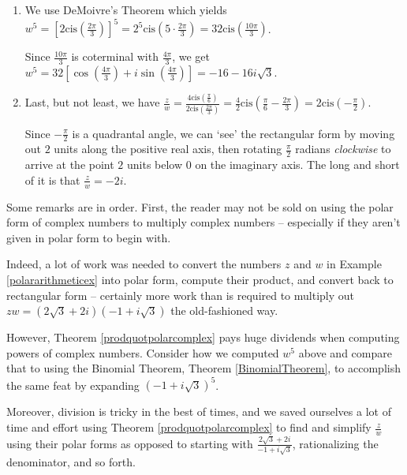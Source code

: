 \documentclass{ximera}
\begin{document}
\begin{example}
\begin{explanation}
\begin{enumerate}
\item We use DeMoivre's Theorem which yields $w^{5} = \left[2\text{cis}\left(\frac{2\pi}{3}\right)\right]^{5} = 2^{5} \text{cis} \left(5\cdot \frac{2\pi}{3}\right) = 32 \text{cis}\left(\frac{10\pi}{3}\right)$.  

 

Since $\frac{10\pi}{3}$ is coterminal with $\frac{4\pi}{3}$, we get $w^{5} = 32\left[ \cos\left(\frac{4\pi}{3}\right) + i\sin\left(\frac{4\pi}{3}\right) \right] = -16-16i\sqrt{3}$.

\item  Last, but not least, we have $\frac{z}{w} = \frac{4 \text{cis}\left(\frac{\pi}{6}\right)}{2\text{cis}\left(\frac{2\pi}{3}\right)} = \frac{4}{2} \text{cis}\left(\frac{\pi}{6} - \frac{2\pi}{3}\right) = 2\text{cis}\left(-\frac{\pi}{2}\right)$.  

 

Since $-\frac{\pi}{2}$ is a quadrantal angle, we can `see' the rectangular form by moving out $2$ units along the positive real axis, then rotating $\frac{\pi}{2}$ radians \textit{clockwise} to arrive at the point $2$ units below $0$ on the imaginary axis.  The long and short of it is that $\frac{z}{w} = -2i$. 

\end{enumerate}
\end{explanation}
\end{example}

Some remarks are in order.  First, the reader may not be sold on using the polar form of complex numbers to multiply complex numbers -- especially if they aren't given in polar form to begin with. 

 

Indeed, a lot of work was needed to convert the numbers $z$ and $w$ in Example \ref{polararithmeticex} into polar form, compute their product, and convert back to rectangular form -- certainly more work than is required to multiply out $zw =  (2\sqrt{3} + 2i)(-1 + i\sqrt{3})$ the old-fashioned way.  

 

However, Theorem \ref{prodquotpolarcomplex} pays huge dividends when computing powers of complex numbers.  Consider how we computed $w^{5}$ above and compare that to using the Binomial Theorem, Theorem \ref{BinomialTheorem}, to accomplish the same feat by expanding  $(-1 + i\sqrt{3})^{5}$. 

 

Moreover,  division is tricky in the best of times, and we saved ourselves a lot of time and effort using Theorem \ref{prodquotpolarcomplex} to find and simplify $\frac{z}{w}$ using their polar forms as opposed to starting with $\frac{2\sqrt{3} + 2i}{-1 + i\sqrt{3}}$, rationalizing the denominator, and so forth.    
\end{document}
